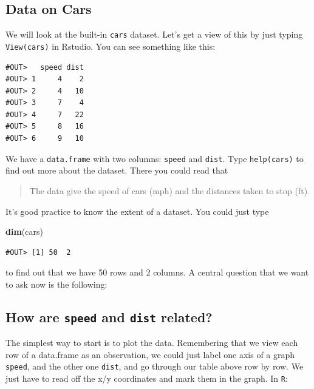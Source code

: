 \documentclass[]{book}
\newenvironment{Shaded}{\begin{snugshade}}{\end{snugshade}}
\newcommand{\KeywordTok}[1]{\textcolor[rgb]{0.13,0.29,0.53}{\textbf{#1}}}
\newcommand{\NormalTok}[1]{#1}
\theoremstyle{definition}
\theoremstyle{definition}
\theoremstyle{definition}
\theoremstyle{remark}
\begin{document}
\subsection{Data on Cars}\label{data-on-cars}

We will look at the built-in \texttt{cars} dataset. Let's get a view of
this by just typing \texttt{View(cars)} in Rstudio. You can see
something like this:

\begin{verbatim}
#OUT>   speed dist
#OUT> 1     4    2
#OUT> 2     4   10
#OUT> 3     7    4
#OUT> 4     7   22
#OUT> 5     8   16
#OUT> 6     9   10
\end{verbatim}

We have a \texttt{data.frame} with two columns: \texttt{speed} and
\texttt{dist}. Type \texttt{help(cars)} to find out more about the
dataset. There you could read that

\begin{quote}
The data give the speed of cars (mph) and the distances taken to stop
(ft).
\end{quote}

It's good practice to know the extent of a dataset. You could just type

\begin{Shaded}
\begin{Highlighting}[]
\KeywordTok{dim}\NormalTok{(cars)}
\end{Highlighting}
\end{Shaded}

\begin{verbatim}
#OUT> [1] 50  2
\end{verbatim}

to find out that we have 50 rows and 2 columns. A central question that
we want to ask now is the following:

\subsection{\texorpdfstring{How are \texttt{speed} and \texttt{dist}
related?}{How are speed and dist related?}}\label{how-are-speed-and-dist-related}

The simplest way to start is to plot the data. Remembering that we view
each row of a data.frame as an observation, we could just label one axis
of a graph \texttt{speed}, and the other one \texttt{dist}, and go
through our table above row by row. We just have to read off the x/y
coordinates and mark them in the graph. In \texttt{R}:
\end{document}
